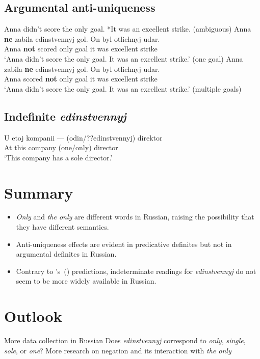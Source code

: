 \documentclass{article}
\newcommand{\citegen}[1]{\citeauthor{#1}'s~(\citeyear{#1})}
\begin{document}
\subsection*{Argumental anti-uniqueness}
\begin{exe}
	\ex Anna didn't score the only goal. *It was an excellent strike. (ambiguous)
	\ex \gll Anna \textbf{ne} zabila edinstvennyj gol. On byl otlichnyj udar.\\
	Anna \textbf{not} scored only goal it was excellent strike\\
	\glt `Anna didn't score the only goal. It was an excellent strike.' (one goal)
	\ex \gll Anna zabila \textbf{ne} edinstvennyj gol. On byl otlichnyj udar.\\
	Anna scored \textbf{not} only goal it was excellent strike\\
	\glt `Anna didn't score the only goal. It was an excellent strike.' (multiple goals)
\end{exe}

\subsection*{Indefinite \textit{edinstvennyj}}
\begin{exe}
	\ex \gll U etoj kompanii --- (odin/??edinstvennyj) direktor\\
	At this company {} (one/only) director\\
	\glt `This company has a sole director.'
\end{exe}

\section{Summary}
\begin{itemize}
	\item \textit{Only} and \textit{the only} are different words in Russian,  raising the possibility that they have different semantics.
	\item Anti-uniqueness effects are evident in predicative definites but not in argumental definites in Russian.
	\item Contrary to \citegen{cb2015} predictions, indeterminate readings for \textit{edinstvennyj} do not seem to be more widely available in Russian.
\end{itemize}

\section{Outlook}
\begin{itemize}
	\ex More data collection in Russian
	\ex Does \textit{edinstvennyj} correspond to \textit{only}, \textit{single}, \textit{sole}, or \textit{one}?
	\ex More research on negation and its interaction with \textit{the only}
\end{itemize}


\end{document}
